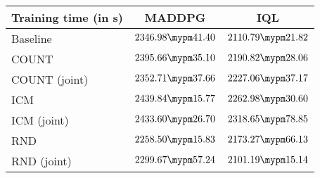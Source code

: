 \begin{tabular}{l | c c}
	Training time (in s) & MADDPG & IQL\\ \toprule
		Baseline & $2346.98 \mypm 41.40$ & $2110.79 \mypm 21.82$ \\ \midrule
	COUNT & $2395.66 \mypm 35.10$ & $2190.82 \mypm 28.06$ \\
	COUNT (joint) & $2352.71 \mypm 37.66$ & $2227.06 \mypm 37.17$ \\\midrule
	ICM & $2439.84 \mypm 15.77$ & $2262.98 \mypm 30.60$ \\
	ICM (joint) & $2433.60 \mypm 26.70$ & $2318.65 \mypm 78.85$ \\\midrule
	RND & $2258.50 \mypm 15.83$ & $2173.27 \mypm 66.13$ \\
	RND (joint) & $2299.67 \mypm 57.24$ & $2101.19 \mypm 15.14$ \\\midrule
\end{tabular}

